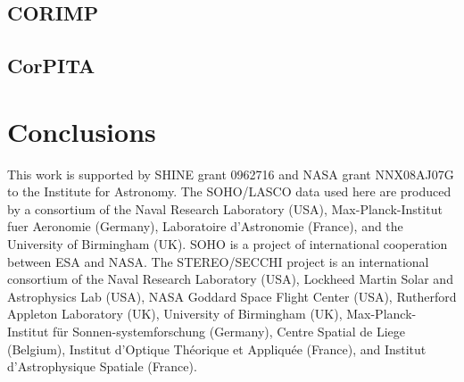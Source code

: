 \documentclass[structabstract]{aa}
\begin{document}
\subsection{CORIMP}
\label{subsect:corimp}

\subsection{CorPITA}
\label{subsect:corpita}

\section{Conclusions}
\label{sect_conclusions}


\begin{acknowledgements}
This work is supported by SHINE grant 0962716 and NASA grant NNX08AJ07G to the Institute for Astronomy. The SOHO/LASCO data used here are produced by a consortium of the Naval Research Laboratory (USA), Max-Planck-Institut fuer Aeronomie (Germany), Laboratoire d'Astronomie (France), and the University of Birmingham (UK). SOHO is a project of international cooperation between ESA and NASA. The STEREO/SECCHI project is an international consortium of the Naval Research Laboratory (USA), Lockheed Martin Solar and Astrophysics Lab (USA), NASA Goddard Space Flight Center (USA), Rutherford Appleton Laboratory (UK), University of Birmingham (UK), Max-Planck-Institut f\"{u}r Sonnen-systemforschung (Germany), Centre Spatial de Liege (Belgium), Institut d'Optique Th\'{e}orique et Appliqu\'{e}e (France), and Institut d'Astrophysique Spatiale (France). 
\end{acknowledgements}
\end{document}
